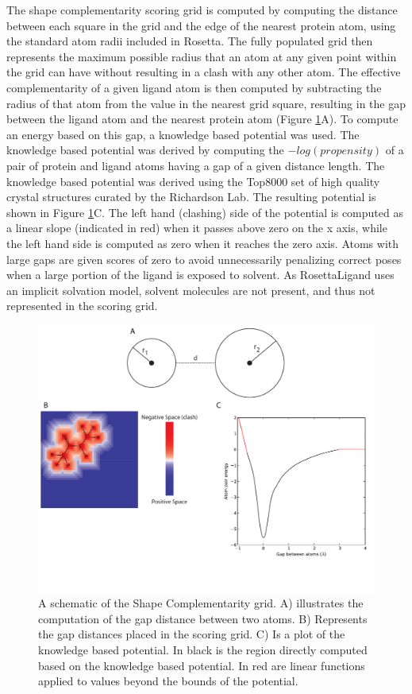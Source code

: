 The shape complementarity scoring grid is computed by computing the distance between each square in the grid and the edge of the nearest protein atom, using the standard atom radii included in Rosetta.
The fully populated grid then represents the maximum possible radius that an atom at any given point within the grid can have without resulting in a clash with any other atom.
The effective complementarity of a given ligand atom is then computed by subtracting the radius of that atom from the value in the nearest grid square, resulting in the gap between the ligand atom and the nearest protein atom (Figure \ref{fig:shape_schematic}A). 
To compute an energy based on this gap, a knowledge based potential was used. 
The knowledge based potential was derived by computing the $-log(propensity)$ of a pair of protein and ligand atoms having a gap of a given distance length.
The knowledge based potential was derived using the Top8000 set of high quality crystal structures curated by the Richardson Lab.
The resulting potential is shown in Figure \ref{fig:shape_schematic}C.
The left hand (clashing) side of the potential is computed as a linear slope (indicated in red) when it passes above zero on the x axis, while the left hand side is computed as zero when it reaches the zero axis.
Atoms with large gaps are given scores of zero to avoid unnecessarily penalizing correct poses when a large portion of the ligand is exposed to solvent.
As RosettaLigand uses an implicit solvation model, solvent molecules are not present, and thus not represented in the scoring grid.
\begin{figure}
\centering
\includegraphics[width=6in]{figures/lowres_appendix/Shape_Complementarity.pdf}
\caption{
A schematic of the Shape Complementarity grid.
A) illustrates the computation of the gap distance between two atoms.
B) Represents the gap distances placed in the scoring grid.
C) Is a plot of the knowledge based potential.
In black is the region directly computed based on the knowledge based potential.
In red are linear functions applied to values beyond the bounds of the potential.
}
\label{fig:shape_schematic}
\end{figure}

